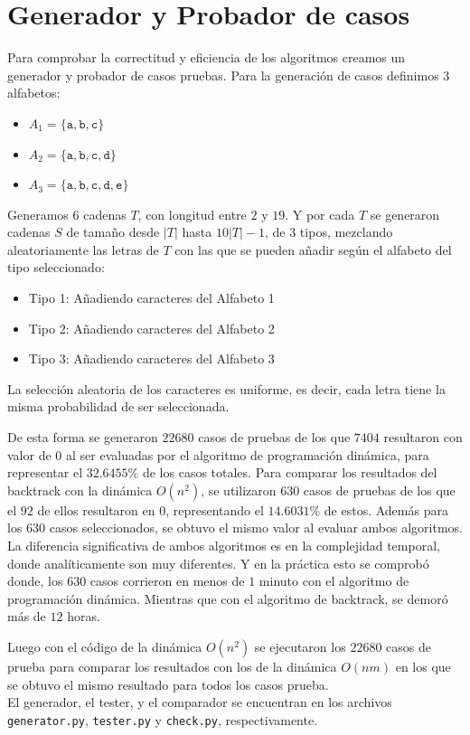 \documentclass[a4paper]{article}
\begin{document}
    \section*{Generador y Probador de casos}

	
	Para comprobar la correctitud y eficiencia de los algoritmos creamos un generador y probador de casos pruebas. Para la generación de casos definimos 3 alfabetos:
	\begin{itemize}
		\item $A_1 = \{\texttt{a},\texttt{b},\texttt{c}\}$
		\item $A_2 = \{\texttt{a},\texttt{b},\texttt{c},\texttt{d}\}$
		\item $A_3 = \{\texttt{a},\texttt{b},\texttt{c},\texttt{d},\texttt{e}\}$
	\end{itemize}

	Generamos $6$ cadenas $T$, con longitud entre $2$ y $19$. Y por cada $T$ se generaron cadenas $S$ de tamaño desde $|T|$ hasta $10|T|-1$, de $3$ tipos, mezclando aleatoriamente las letras de $T$ con las que se pueden añadir según el alfabeto del tipo seleccionado:
	\begin{itemize}
	\item Tipo 1: Añadiendo caracteres del Alfabeto 1
	\item Tipo 2: Añadiendo caracteres del Alfabeto 2
	\item Tipo 3: Añadiendo caracteres del Alfabeto 3
	\end{itemize}
	La selección aleatoria de los caracteres es uniforme, es decir, cada letra tiene la misma probabilidad de ser seleccionada.
	
	De esta forma se generaron $22680$ casos de pruebas de los que $7404$ resultaron con valor de $0$ al ser evaluadas por el algoritmo de programación dinámica, para representar el $32.6455\%$ de los casos totales. Para comparar los resultados del backtrack con la din\'amica $O(n^2)$, se utilizaron $630$ casos de pruebas de los que el $92$ de ellos resultaron en $0$, representando el $14.6031\%$ de estos. Además para los $630$ casos seleccionados, se obtuvo el mismo valor al evaluar ambos algoritmos. La diferencia significativa de ambos algoritmos es en la complejidad temporal, donde analíticamente son muy diferentes. Y en la práctica esto se comprobó donde, los $630$ casos corrieron en menos de $1$ minuto con el algoritmo de programación dinámica. Mientras que con el algoritmo de backtrack, se demoró más de $12$ horas.
	
    Luego con el c\'odigo de la din\'amica $O(n^2)$ se ejecutaron los $22680$ casos de prueba para comparar los resultados con los de la din\'amica $O(nm)$ en los que se obtuvo el mismo resultado para todos los casos prueba.\\

	El generador, el tester, y el comparador se encuentran en los archivos \texttt{generator.py}, \texttt{tester.py} y \texttt{check.py}, respectivamente.
\end{document}
